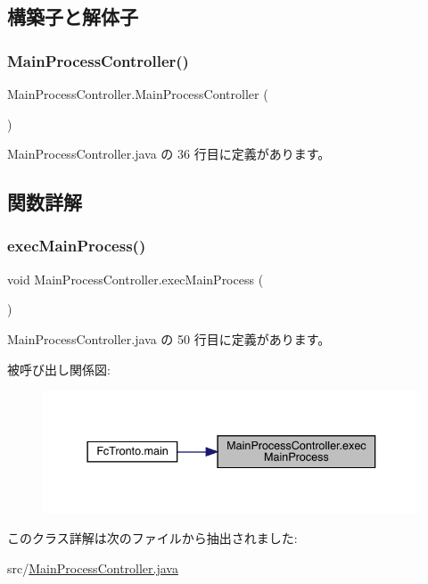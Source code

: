 \subsection{構築子と解体子}
\mbox{\label{class_main_process_controller_af422b069cc9f6cadb45a64ef985bd536}} 
\subsubsection{\texorpdfstring{MainProcessController()}{MainProcessController()}}
{\footnotesize\ttfamily Main\+Process\+Controller.\+Main\+Process\+Controller (\begin{DoxyParamCaption}{ }\end{DoxyParamCaption})\hspace{0.3cm}{\ttfamily [inline]}}



 Main\+Process\+Controller.\+java の 36 行目に定義があります。



\subsection{関数詳解}
\mbox{\label{class_main_process_controller_ac92bd6b23aa4c17913d6a9c63ee72739}} 
\subsubsection{\texorpdfstring{execMainProcess()}{execMainProcess()}}
{\footnotesize\ttfamily void Main\+Process\+Controller.\+exec\+Main\+Process (\begin{DoxyParamCaption}{ }\end{DoxyParamCaption})\hspace{0.3cm}{\ttfamily [inline]}}



 Main\+Process\+Controller.\+java の 50 行目に定義があります。

被呼び出し関係図\+:\nopagebreak
\begin{figure}[H]
\begin{center}
\leavevmode
\includegraphics[width=337pt]{d2/d71/class_main_process_controller_ac92bd6b23aa4c17913d6a9c63ee72739_icgraph}
\end{center}
\end{figure}


このクラス詳解は次のファイルから抽出されました\+:\begin{DoxyCompactItemize}
\item 
src/\mbox{\hyperlink{_main_process_controller_8java}{Main\+Process\+Controller.\+java}}\end{DoxyCompactItemize}

